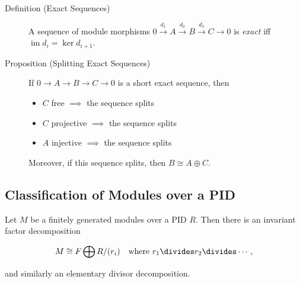 \begin{description}
\item[Definition (Exact Sequences)]
A sequence of module morphisms
\(0 \xrightarrow{d_1} A \xrightarrow{d_2} B \xrightarrow{d_3} C \to 0\)
is \emph{exact} iff \(\operatorname{im}d_i = \ker d_{i+1}\).
\item[Proposition (Splitting Exact Sequences)]
If \(0 \to A \to B \to C \to 0\) is a short exact sequence, then

\begin{itemize}
\tightlist
\item
  \(C\) free \(\implies\) the sequence splits
\item
  \(C\) projective \(\implies\) the sequence splits
\item
  \(A\) injective \(\implies\) the sequence splits
\end{itemize}

Moreover, if this sequence splits, then \(B \cong A \oplus C\).
\end{description}

\hypertarget{classification-of-modules-over-a-pid}{%
\subsection{Classification of Modules over a
PID}\label{classification-of-modules-over-a-pid}}

Let \(M\) be a finitely generated modules over a PID \(R\). Then there
is an invariant factor decomposition

\begin{align*} M \cong F \bigoplus R/(r_i) \quad\text{where } r_1 \divides r_2 \divides \cdots ,\end{align*}

and similarly an elementary divisor decomposition.

